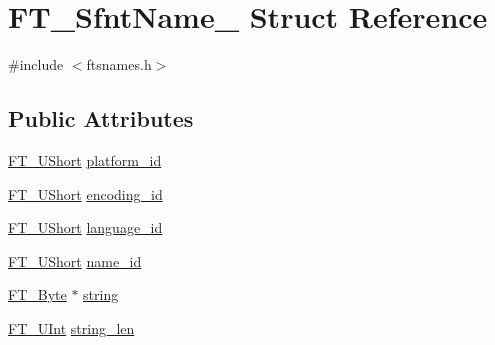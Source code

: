 \hypertarget{struct_f_t___sfnt_name__}{\section{F\-T\-\_\-\-Sfnt\-Name\-\_\- Struct Reference}
\label{struct_f_t___sfnt_name__}
}


{\ttfamily \#include $<$ftsnames.\-h$>$}

\subsection*{Public Attributes}
\begin{DoxyCompactItemize}
\item 
\hyperlink{fttypes_8h_a937f6c17cf5ffd09086d8610c37b9f58}{F\-T\-\_\-\-U\-Short} \hyperlink{struct_f_t___sfnt_name___ae92450a058eb4737df85f66226d69f43}{platform\-\_\-id}
\item 
\hyperlink{fttypes_8h_a937f6c17cf5ffd09086d8610c37b9f58}{F\-T\-\_\-\-U\-Short} \hyperlink{struct_f_t___sfnt_name___a01f4573605eab3f4d2e4b9b50b0de98f}{encoding\-\_\-id}
\item 
\hyperlink{fttypes_8h_a937f6c17cf5ffd09086d8610c37b9f58}{F\-T\-\_\-\-U\-Short} \hyperlink{struct_f_t___sfnt_name___a6fb23e0f299a97b25b63805b04cf1fc5}{language\-\_\-id}
\item 
\hyperlink{fttypes_8h_a937f6c17cf5ffd09086d8610c37b9f58}{F\-T\-\_\-\-U\-Short} \hyperlink{struct_f_t___sfnt_name___ac07be3e852408990fe0a910f00b68f4e}{name\-\_\-id}
\item 
\hyperlink{fttypes_8h_a51f26183ca0c9f4af958939648caeccd}{F\-T\-\_\-\-Byte} $\ast$ \hyperlink{struct_f_t___sfnt_name___ab369e2c3d8dc9662f69c53e4d3158067}{string}
\item 
\hyperlink{fttypes_8h_abcb8db4dbf35d2b55a9e8c7b0926dc52}{F\-T\-\_\-\-U\-Int} \hyperlink{struct_f_t___sfnt_name___a4ebdb7207b5681d16f9cc17f432cb56f}{string\-\_\-len}
\end{DoxyCompactItemize}


